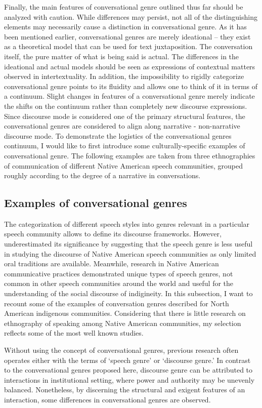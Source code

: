 \documentclass[12pt]{article}
\begin{document}
Finally, the main features of conversational genre outlined thus far should be analyzed with caution. While differences may persist, not all of the distinguishing elements may necessarily cause a distinction in conversational genre. As it has been mentioned earlier, conversational genres are merely ideational -- they exist as a theoretical model that can be used for text juxtaposition. The conversation itself, the pure matter of what is being said is actual. The differences in the ideational and actual models should be seen as expressions of contextual matters observed in intertextuality. In addition, the impossibility to rigidly categorize conversational genre points to its fluidity and allows one to think of it in terms of a continuum. Slight changes in features of a conversational genre merely indicate the shifts on the continuum rather than completely new discourse expressions. Since discourse mode is considered one of the primary structural features, the conversational genres are considered to align along narrative - non-narrative discourse mode. To demonstrate the logistics of the conversational genres continuum, I would like to first introduce some culturally-specific examples of conversational genre. The following examples are taken from three ethnographies of communication of different Native American speech communities, grouped roughly according to the degree of a narrative in conversations. 
\subsection{Examples of conversational genres}
The categorization of different speech styles into genres relevant in a particular speech community allows to define its discourse frameworks. However, \textcite[p. 102]{dementyev2015} underestimated its significance by suggesting that the speech genre is less useful in studying the discourse of Native American speech communities as only limited oral traditions are available. Meanwhile, research in Native American communicative practices demonstrated unique types of speech genres, not common in other speech communities around the world and useful for the understanding of the social discourse of indigineity. In this subsection, I want to recount some of the examples of conversation genres described for North American indigenous communities. Considering that there is little research on ethnography of speaking among Native American communities, my selection reflects some of the most well known studies.

Without using the concept of conversational genres, previous research often operates either with the terms of `speech genre' or `discourse genre.' In contrast to the conversational genres proposed here, discourse genre can be attributed to interactions in institutional setting, where power and authority may be unevenly balanced. Nonetheless, by discerning the structural and exigent features of an interaction, some differences in conversational genres are observed. 
\end{document}
